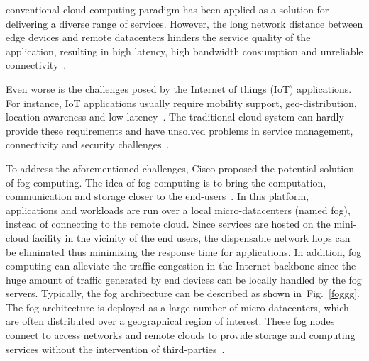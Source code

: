 \documentclass[10pt,journal,compsoc]{IEEEtran}
\newcommand{\Fig}[1]{Fig.~\ref{#1}}
\begin{document}
% 
% 
% 
% 
 conventional cloud computing paradigm has been applied as a solution for delivering a diverse range of services. However, the long network distance between edge devices and remote datacenters hinders the service quality of the application, resulting in high latency, high bandwidth consumption and unreliable connectivity~\cite{Vaquero:2014:FYW:2677046.2677052}. 

Even worse is the challenges posed by the Internet of things (IoT) applications. For instance, IoT applications usually require mobility support, geo-distribution, location-awareness and low latency~\cite{bonomi2014fog}. The traditional cloud system can hardly provide these requirements and have unsolved problems in service management, connectivity and security challenges~\cite{yi2015survey}. 

To address the aforementioned challenges, Cisco proposed the potential solution of fog computing. The idea of fog computing is to bring the computation, communication and storage closer to the end-users~\cite{yi2015survey}. In this platform, applications and workloads are run over a local micro-datacenters (named fog), instead of connecting to the remote cloud. Since services are hosted on the mini-cloud facility in the vicinity of the end users, the dispensable network hops can be eliminated thus minimizing the response time for applications. In addition, fog computing can alleviate the traffic congestion in the Internet backbone since the huge amount of traffic generated by end devices can be locally handled by the fog servers. Typically, the fog architecture can be described as shown in~\Fig{foggg}. The fog architecture is deployed as a large number of micro-datacenters, which are often distributed over a geographical region of interest. These fog nodes connect to access networks and remote clouds to provide storage and computing services without the intervention of third-parties~\cite{chiang2016fog}.
\end{document}

